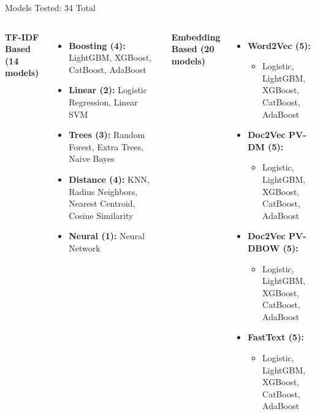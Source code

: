 \documentclass[
    10pt,
    aspectratio=169,
]{beamer}
\begin{document}
\begin{frame}{Models Tested: 34 Total}
\small
\begin{columns}[t]
\textbf{TF-IDF Based (14 models)}
\begin{itemize}
  \item \textbf{Boosting (4):} LightGBM, XGBoost, CatBoost, AdaBoost
  \item \textbf{Linear (2):} Logistic Regression, Linear SVM
  \item \textbf{Trees (3):} Random Forest, Extra Trees, Naive Bayes
  \item \textbf{Distance (4):} KNN, Radius Neighbors, Nearest Centroid, Cosine Similarity
  \item \textbf{Neural (1):} Neural Network
\end{itemize}

\textbf{Embedding Based (20 models)}
\begin{itemize}
  \item \textbf{Word2Vec (5):}
  \begin{itemize}
    \scriptsize
    \item Logistic, LightGBM, XGBoost, CatBoost, AdaBoost
  \end{itemize}
  \item \textbf{Doc2Vec PV-DM (5):}
  \begin{itemize}
    \scriptsize
    \item Logistic, LightGBM, XGBoost, CatBoost, AdaBoost
  \end{itemize}
  \item \textbf{Doc2Vec PV-DBOW (5):}
  \begin{itemize}
    \scriptsize
    \item Logistic, LightGBM, XGBoost, CatBoost, AdaBoost
  \end{itemize}
  \item \textbf{FastText (5):}
  \begin{itemize}
    \scriptsize
    \item Logistic, LightGBM, XGBoost, CatBoost, AdaBoost
  \end{itemize}
\end{itemize}
\end{columns}
\end{frame}

\end{document}
